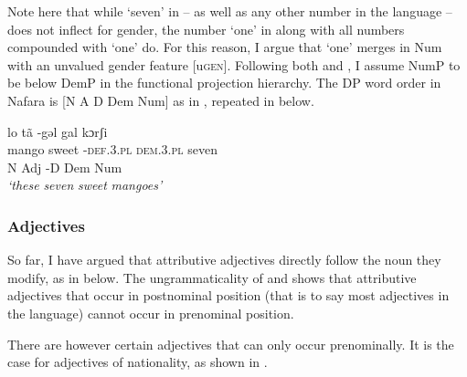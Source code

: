\documentclass[output=paper]{langscibook}
\begin{document}
Note here that while ‘seven’ in  – as well as any other number in the language – does not inflect for gender, the number ‘one’ in  along with all numbers compounded with ‘one’ do. For this reason, I argue that ‘one’ merges in Num with an unvalued gender feature [u\textsc{gen}]. Following both \citet{Greenberg1963} and \citet{Cinque2005}, I assume NumP to be below DemP in the functional projection hierarchy. The DP word order in Nafara is [N A D Dem Num] as in , repeated in  below.

 
\ea\label{ex:baron:8}
\glll lo  tã -gəl  gal  kɔrʃi\\
mango sweet -\textsc{def.3.pl} \textsc{dem.3.pl} seven\\
N  Adj  -D  Dem  Num\\
\glt \textit{‘these} \textit{seven} \textit{sweet} \textit{mangoes’}
\z


\subsubsection{Adjectives}
\label{sec:baron:2.1.5}
So far, I have argued that attributive adjectives directly follow the noun they modify, as in  below. The ungrammaticality of  and  shows that attributive adjectives that occur in postnominal position (that is to say most adjectives in the language) cannot occur in prenominal position.
 
\ea\label{ex:baron:9}
 

\z
\z

There are however certain adjectives that can only occur prenominally. It is the case for adjectives of nationality, as shown in .
\end{document}
